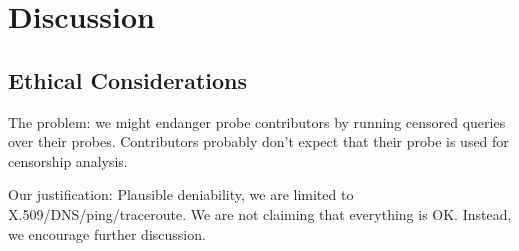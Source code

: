 \section{Discussion}

\subsection{Ethical Considerations}

The problem: we might endanger probe contributors by running censored queries over their probes.
Contributors probably don't expect that their probe is used for censorship analysis.

Our justification: Plausible deniability, we are limited to X.509/DNS/ping/traceroute.  We are not
claiming that everything is OK.  Instead, we encourage further discussion.
